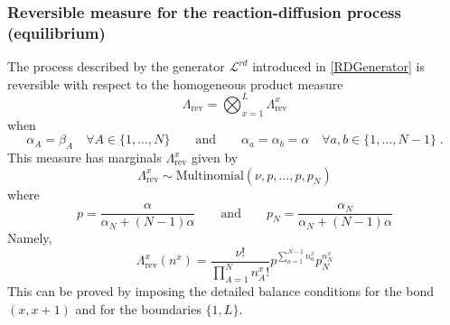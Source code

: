 \documentclass[10pt]{article}
\numberwithin{equation}{section}
\numberwithin{equation}{subsection}
\newcommand{\dt}{\;.}
\newcommand{\twoj}{\nu}
\begin{document}
{\subsubsection{Reversible measure for the reaction-diffusion process (equilibrium)} 
The process described by the generator $\mathcal{L}^{rd}$ introduced in \eqref{RDGenerator} is reversible with respect to the homogeneous product measure \begin{equation}\label{reversibleMeasureRD}
	\Lambda_{\text{rev}}=\bigotimes_{x=1}^{L}\Lambda_{\text{rev}}^{x}
\end{equation}
when
\begin{equation}\label{reversibilityConditionRD}
	\alpha_{A}=\beta_{A}\quad\forall A\in\{1,\ldots,N\}\qquad \text{and}\qquad \alpha_{a}=\alpha_{b}=\alpha \quad \forall a,b\in \{1,\ldots,N-1\}\dt
\end{equation}
This measure has marginals $\Lambda_{\text{rev}}^{x}$ given by 
\begin{equation}
	\Lambda^{x}_{\text{rev}}\sim \text{Multinomial}\left(\twoj,p,\ldots,p,p_{N}\right)
\end{equation}
where 
\begin{equation}
	p=\frac{\alpha}{\alpha_{N}+(N-1)\alpha}\qquad \text{and}\qquad p_{N}=\frac{\alpha_{N}}{\alpha_{N}+(N-1)\alpha}
\end{equation}
Namely,
\begin{equation}
	\Lambda_{\text{rev}}^{x}(n^{x})=\frac{\nu!}{\prod_{A=1}^{N}n_{A}^{x}!}p^{\sum_{a=1}^{N-1}n_{a}^{x}}p_{N}^{n_{N}^{x}}
\end{equation} 
This can be proved by imposing the detailed balance conditions for the bond $(x,x+1)$ and for the boundaries $\{1,L\}$.\\

}
\end{document}
